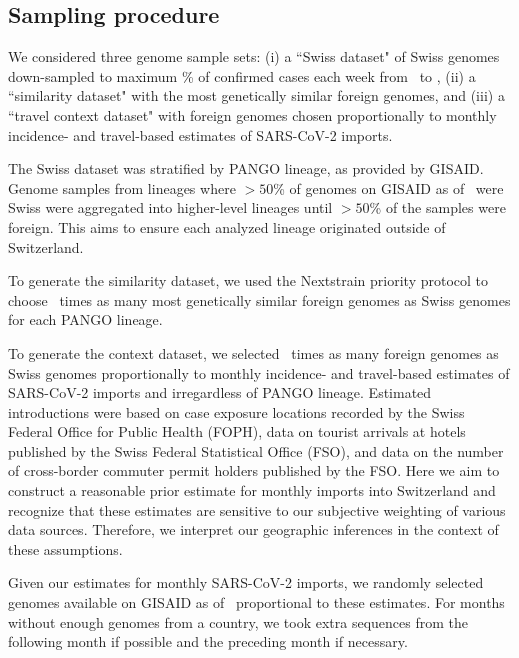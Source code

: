 \documentclass[9pt,twocolumn,twoside,lineno]{pnas-new}
\begin{document}
\subsection{Sampling procedure}

We considered three genome sample sets: (i) a ``Swiss dataset" of Swiss genomes down-sampled to maximum \maxsamplingpercent\% of confirmed cases each week from \mindate\ to \maxdate, (ii) a ``similarity dataset" with the most genetically similar foreign genomes, and (iii) a ``travel context dataset" with foreign genomes chosen proportionally to monthly incidence- and travel-based estimates of SARS-CoV-2 imports.  

The Swiss dataset was stratified by PANGO lineage, as provided by GISAID. Genome samples from lineages where $>50$\% of genomes on GISAID as of \GISAIDpulldate\ were Swiss were aggregated into higher-level lineages until $>50$\% of the samples were foreign. This aims to ensure each analyzed lineage originated outside of Switzerland.

To generate the similarity dataset, we used the Nextstrain priority protocol to choose \gensimscalefactor\ times as many most genetically similar foreign genomes as Swiss genomes for each PANGO lineage. 

To generate the context dataset, we selected \travelcontextscalefactor\ times as many foreign genomes as Swiss genomes proportionally to monthly incidence- and travel-based estimates of SARS-CoV-2 imports and irregardless of PANGO lineage. Estimated introductions were based on case exposure locations recorded by the Swiss Federal Office for Public Health (FOPH), data on tourist arrivals at hotels published by the Swiss Federal Statistical Office (FSO), and data on the number of cross-border commuter permit holders published by the FSO. Here we aim to construct a reasonable prior estimate for monthly imports into Switzerland and recognize that these estimates are sensitive to our subjective weighting of various data sources. Therefore, we interpret our geographic inferences in the context of these assumptions.

Given our estimates for monthly SARS-CoV-2 imports, we randomly selected genomes available on GISAID as of \GISAIDpulldate\ proportional to these estimates. For months without enough genomes from a country, we took extra sequences from the following month if possible and the preceding month if necessary. 
\end{document}
